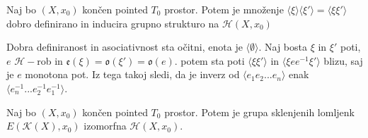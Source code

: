 \documentclass[mat1]{fmfdelo}
\DeclareRobustCommand{\k}{
    \mathcal{K}
}
\DeclareRobustCommand{\h}{
    \mathcal{H}
}
\begin{document}
\begin{izrek}
    Naj bo $(X,x_0)$ končen pointed $T_0$ prostor. Potem je množenje $\langle\xi\rangle\langle\xi'\rangle=\langle\xi\xi'\rangle$ dobro definirano in inducira grupno strukturo na $\mathscr{H}(X,x_0)$
\end{izrek}

\begin{dokaz}
    Dobra definiranost in asociativnost sta očitni, enota je $\langle\emptyset\rangle$. Naj bosta $\xi$ in $\xi'$ poti, $e$ $\h-$rob in $\mathfrak{e}(\xi)=\mathfrak{o}(\xi')=\mathfrak{o}(e)$. potem sta poti $\langle\xi \xi'\rangle$ in $\langle\xi e e^{-1} \xi'\rangle$ blizu, saj je $e$ monotona pot. Iz tega takoj sledi, da je inverz od $\langle e_1 e_2...e_n\rangle$ enak $\langle e_n^{-1}...e_2^{-1}e_1^{-1}\rangle$.
\end{dokaz}


\begin{izrek}
    Naj bo $(X,x_0)$ končen pointed $T_0$ prostor. Potem je grupa sklenjenih lomljenk $E(\k(X),x_0)$ izomorfna $\mathscr{H}(X,x_0)$.
\end{izrek}
\end{document}
